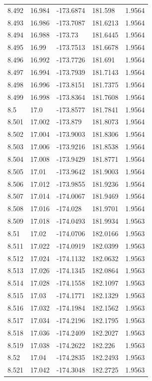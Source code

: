 \begin{tabular}{lllll}
8.492 & 16.984 & -173.6874 & 181.598 & 1.9564 \\
8.493 & 16.986 & -173.7087 & 181.6213 & 1.9564 \\
8.494 & 16.988 & -173.73 & 181.6445 & 1.9564 \\
8.495 & 16.99 & -173.7513 & 181.6678 & 1.9564 \\
8.496 & 16.992 & -173.7726 & 181.691 & 1.9564 \\
8.497 & 16.994 & -173.7939 & 181.7143 & 1.9564 \\
8.498 & 16.996 & -173.8151 & 181.7375 & 1.9564 \\
8.499 & 16.998 & -173.8364 & 181.7608 & 1.9564 \\
8.5 & 17.0 & -173.8577 & 181.7841 & 1.9564 \\
8.501 & 17.002 & -173.879 & 181.8073 & 1.9564 \\
8.502 & 17.004 & -173.9003 & 181.8306 & 1.9564 \\
8.503 & 17.006 & -173.9216 & 181.8538 & 1.9564 \\
8.504 & 17.008 & -173.9429 & 181.8771 & 1.9564 \\
8.505 & 17.01 & -173.9642 & 181.9003 & 1.9564 \\
8.506 & 17.012 & -173.9855 & 181.9236 & 1.9564 \\
8.507 & 17.014 & -174.0067 & 181.9469 & 1.9564 \\
8.508 & 17.016 & -174.028 & 181.9701 & 1.9564 \\
8.509 & 17.018 & -174.0493 & 181.9934 & 1.9563 \\
8.51 & 17.02 & -174.0706 & 182.0166 & 1.9563 \\
8.511 & 17.022 & -174.0919 & 182.0399 & 1.9563 \\
8.512 & 17.024 & -174.1132 & 182.0632 & 1.9563 \\
8.513 & 17.026 & -174.1345 & 182.0864 & 1.9563 \\
8.514 & 17.028 & -174.1558 & 182.1097 & 1.9563 \\
8.515 & 17.03 & -174.1771 & 182.1329 & 1.9563 \\
8.516 & 17.032 & -174.1984 & 182.1562 & 1.9563 \\
8.517 & 17.034 & -174.2196 & 182.1795 & 1.9563 \\
8.518 & 17.036 & -174.2409 & 182.2027 & 1.9563 \\
8.519 & 17.038 & -174.2622 & 182.226 & 1.9563 \\
8.52 & 17.04 & -174.2835 & 182.2493 & 1.9563 \\
8.521 & 17.042 & -174.3048 & 182.2725 & 1.9563 \\

\end{tabular}
